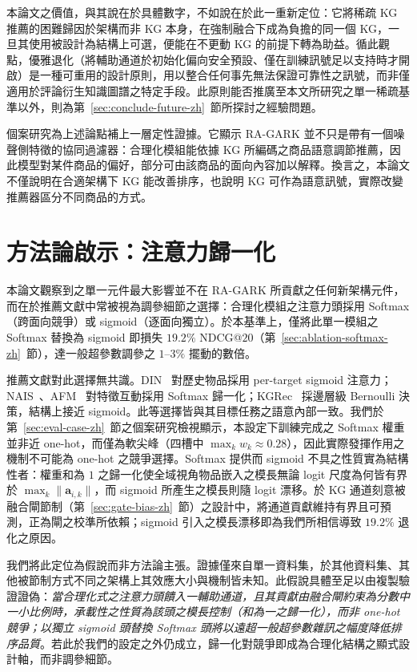 本論文之價值，與其說在於具體數字，不如說在於此一重新定位：它將稀疏 KG 推薦的困難歸因於架構而非 KG 本身，在強制融合下成為負擔的同一個 KG，一旦其使用被設計為結構上可選，便能在不更動 KG 的前提下轉為助益。循此觀點，優雅退化（將輔助通道於初始化偏向安全預設、僅在訓練訊號足以支持時才開啟）是一種可重用的設計原則，用以整合任何事先無法保證可靠性之訊號，而非僅適用於評論衍生知識圖譜之特定手段。此原則能否推廣至本文所研究之單一稀疏基準以外，則為第~\ref{sec:conclude-future-zh}~節所探討之經驗問題。

個案研究為上述論點補上一層定性證據。它顯示 RA-GARK 並不只是帶有一個噪聲側特徵的協同過濾器：合理化模組能依據 KG 所編碼之商品語意調節推薦，因此模型對某件商品的偏好，部分可由該商品的面向內容加以解釋。換言之，本論文不僅說明在合適架構下 KG 能改善排序，也說明 KG 可作為語意訊號，實際改變推薦器區分不同商品的方式。

\section{方法論啟示：注意力歸一化}
\label{sec:conclude-insight-zh}

本論文觀察到之單一元件最大影響並不在 RA-GARK 所貢獻之任何新架構元件，而在於推薦文獻中常被視為調參細節之選擇：合理化模組之注意力頭採用 Softmax（跨面向競爭）或 sigmoid（逐面向獨立）。於本基準上，僅將此單一模組之 Softmax 替換為 sigmoid 即損失 $19.2\%$ NDCG@$20$（第~\ref{sec:ablation-softmax-zh}~節），達一般超參數調參之 $1$--$3\%$ 擺動的數倍。

推薦文獻對此選擇無共識。DIN~\cite{zhou2018din} 對歷史物品採用 per-target sigmoid 注意力；NAIS~\cite{he2018nais}、AFM~\cite{xiao2017afm} 對特徵互動採用 Softmax 歸一化；KGRec~\cite{yang2023kgrec} 採邊層級 Bernoulli 決策，結構上接近 sigmoid。此等選擇皆與其目標任務之語意內部一致。我們於第~\ref{sec:eval-case-zh}~節之個案研究檢視顯示，本設定下訓練完成之 Softmax 權重並非近 one-hot，而僅為軟尖峰（四槽中 $\max_k w_k \approx 0.28$），因此實際發揮作用之機制不可能為 one-hot 之競爭選擇。Softmax 提供而 sigmoid 不具之性質實為結構性者：權重和為 $1$ 之歸一化使全域視角物品嵌入之模長無論 logit 尺度為何皆有界於 $\max_k \|\mathbf{a}_{i,k}\|$，而 sigmoid 所產生之模長則隨 logit 漂移。於 KG 通道刻意被融合閘節制（第~\ref{sec:gate-bias-zh}~節）之設計中，將通道貢獻維持有界且可預測，正為閘之校準所依賴；sigmoid 引入之模長漂移即為我們所相信導致 $19.2\%$ 退化之原因。

我們將此定位為假說而非方法論主張。證據僅來自單一資料集，於其他資料集、其他被節制方式不同之架構上其效應大小與機制皆未知。此假說具體至足以由複製驗證證偽：\emph{當合理化式之注意力頭饋入一輔助通道，且其貢獻由融合閘約束為分數中一小比例時，承載性之性質為該頭之模長控制（和為一之歸一化），而非 one-hot 競爭；以獨立 sigmoid 頭替換 Softmax 頭將以遠超一般超參數雜訊之幅度降低排序品質}。若此於我們的設定之外仍成立，歸一化對競爭即成為合理化結構之顯式設計軸，而非調參細節。

